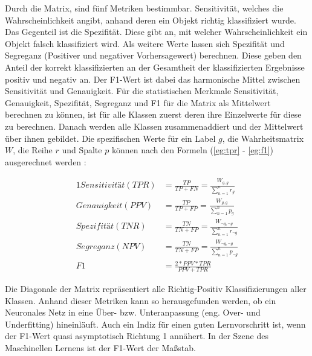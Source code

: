 Durch die Matrix, sind fünf Metriken bestimmbar. Sensitivität, welches die Wahrscheinlichkeit angibt, anhand deren ein Objekt richtig klassifiziert wurde. Das Gegenteil ist die Spezifität. Diese gibt an, mit welcher Wahrscheinlichkeit ein Objekt falsch klassifiziert wird. Als weitere Werte lassen sich Spezifität und Segreganz (Positiver und negativer Vorhersagewert) berechnen. Diese geben den Anteil der korrekt klassifizierten an der Gesamtheit der klassifizierten Ergebnisse positiv und negativ an. Der F1-Wert ist dabei das harmonische Mittel zwischen Sensitivität und Genauigkeit. Für die statistischen Merkmale Sensitivität, Genauigkeit, Spezifität, Segreganz und F1 für die Matrix als Mittelwert berechnen zu können, ist für alle Klassen zuerst deren ihre Einzelwerte für diese zu berechnen. Danach werden alle Klassen zusammenaddiert und der Mittelwert über ihnen gebildet. Die spezifischen Werte für ein Label $g$, die Wahrheitsmatrix $W$, die Reihe $r$ und Spalte $p$ können nach den Formeln (\ref{eg:tpr} - \ref{eg:f1}) ausgerechnet werden \cite{matrix_calc_paper}:


\begin{alignat}{1}
  Sensitivität (TPR) &= \frac{TP}{TP + FN} = \frac{W_{g, g}}{\sum_{n=1}^{n} r_{g}}\label{eg:tpr}\\
  Genauigkeit (PPV)  &= \frac{TP}{TP + FP} = \frac{W_{g, g}}{\sum_{n=1}^{n} p_{g}}\label{eg:ppv}\\
  Spezifität (TNR)   &= \frac{TN}{TN + FP} = \frac{W_{\neg g, \neg g}}{\sum_{n=1}^{n} r_{\neg g}}\label{eg:tnr}\\
  Segreganz (NPV)    &= \frac{TN}{TN + FP} = \frac{W_{\neg g, \neg g}}{\sum_{n=1}^{n} p_{\neg g}}\label{eg:npr}\\
  F1                 &= \frac{2 * PPV * TPR}{PPV + TPR}\label{eg:f1}
\end{alignat}


Die Diagonale der Matrix repräsentiert alle Richtig-Positiv Klassifizierungen aller Klassen. Anhand dieser Metriken kann so herausgefunden werden, ob ein Neuronales Netz in eine Über- bzw. Unteranpassung (eng. Over- und Underfitting) hineinläuft. Auch ein Indiz für einen guten Lernvorschritt ist, wenn der F1-Wert quasi asymptotisch Richtung 1 annähert. In der Szene des Maschinellen Lernens ist der F1-Wert der Maßstab.


























